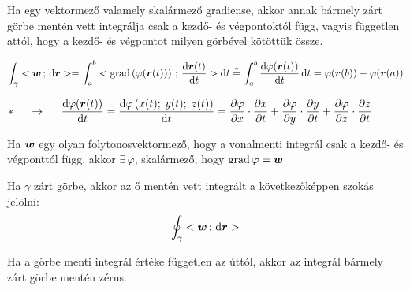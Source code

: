 \documentclass[main.tex]{subfiles}
\begin{document}

Ha egy vektormező valamely skalármező gradiense,
akkor annak bármely zárt görbe mentén vett integrálja
csak a kezdő- és végpontoktól függ,
vagyis független attól, hogy a kezdő- és végpontot
milyen görbével kötöttük össze.

\begin{equation*}
  \int_{\gamma} \scalar{\rvec{w}}{\differential \rvec{r}}
  = \int_a^b \scalar{\grad \left( \varphi(\rvec{r}(t)) \right)}
  {\derivative{\rvec{r}(t)}{t}} \differential t
  \overset{*}{=} \int_a^b \derivative{\varphi(\rvec{r}(t))}{t} \, \differential t
  = \varphi(\rvec{r}(b)) - \varphi(\rvec{r}(a))
\end{equation*}

\begin{equation*}
  * \hspace{5mm} \rightarrow \hspace{5mm}
  \derivative{\varphi(\rvec{r}(t))}{t}
  = \derivative{\varphi\left(
    x(t) ; \; y(t) ; \; z(t)
    \right)}{t}
  = \partialderivative{\varphi}{x} \cdot \partialderivative{x}{t}
  + \partialderivative{\varphi}{y} \cdot \partialderivative{y}{t}
  + \partialderivative{\varphi}{z} \cdot \partialderivative{z}{t}
  \hspace{10mm}
\end{equation*}



Ha $\boldsymbol{w}$ egy olyan folytonosvektormező,
hogy a vonalmenti integrál csak a kezdő- és
végponttól függ, akkor $\exists \, \varphi$,
skalármező, hogy $\operatorname{grad} \varphi = \boldsymbol{w}$




Ha $\gamma$ zárt görbe, akkor az ő mentén vett integrált
a következőképpen szokás jelölni:
\begin{equation*}
  \oint_{\gamma} \scalar{\rvec{w}}{\differential \rvec{r}}
\end{equation*}




Ha a görbe menti integrál értéke független az úttól,
akkor az integrál bármely zárt görbe mentén zérus.



\end{document}
